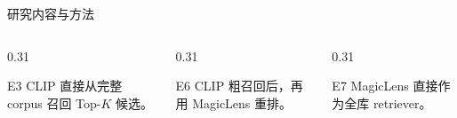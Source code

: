 \documentclass[10pt,aspectratio=169,]{beamer}
\begin{document}
\begin{frame}{研究内容与方法}
	\vspace{0.25em}
	\scriptsize
	\begin{columns}[T]
		\begin{column}{0.31\textwidth}
			\begin{block}{E3}
				CLIP 直接从完整 corpus 召回 Top-$K$ 候选。
			\end{block}
		\end{column}
		\begin{column}{0.31\textwidth}
			\begin{alertblock}{E6}
				CLIP 粗召回后，再用 MagicLens 重排。
			\end{alertblock}
		\end{column}
		\begin{column}{0.31\textwidth}
			\begin{block}{E7}
				MagicLens 直接作为全库 retriever。
			\end{block}
		\end{column}
	\end{columns}
\end{frame}
\end{document}
